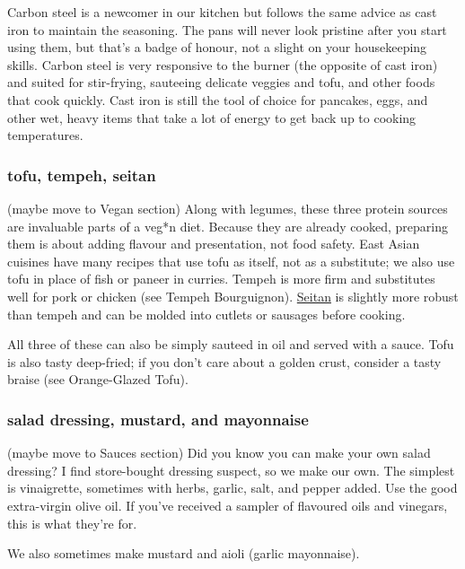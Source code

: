 Carbon steel is a newcomer in our kitchen but follows the same advice as cast iron to maintain the seasoning. The pans will never look pristine after you start using them, but that's a badge of honour, not a slight on your housekeeping skills. Carbon steel is very responsive to the burner (the opposite of cast iron) and suited for stir-frying, sauteeing delicate veggies and tofu, and other foods that cook quickly. Cast iron is still the tool of choice for pancakes, eggs, and other wet, heavy items that take a lot of energy to get back up to cooking temperatures.

\subsubsection{tofu, tempeh, seitan}
(maybe move to Vegan section)
Along with legumes, these three protein sources are invaluable parts of a veg*n diet. Because they are already cooked, preparing them is about adding flavour and presentation, not food safety. East Asian cuisines have many recipes that use tofu as itself, not as a substitute; we also use tofu in place of fish or paneer in curries. Tempeh is more firm and substitutes well for pork or chicken (see Tempeh Bourguignon). \hyperref[Seitan]{Seitan} is slightly more robust than tempeh and can be molded into cutlets or sausages before cooking.

All three of these can also be simply sauteed in oil and served with a sauce. Tofu is also tasty deep-fried; if you don't care about a golden crust, consider a tasty braise (see Orange-Glazed Tofu).

\subsubsection{salad dressing, mustard, and mayonnaise}
(maybe move to Sauces section)
Did you know you can make your own salad dressing? I find store-bought dressing suspect, so we make our own. The simplest is vinaigrette, sometimes with herbs, garlic, salt, and pepper added. Use the good extra-virgin olive oil. If you've received a sampler of flavoured oils and vinegars, this is what they're for.

We also sometimes make mustard and aioli (garlic mayonnaise).

